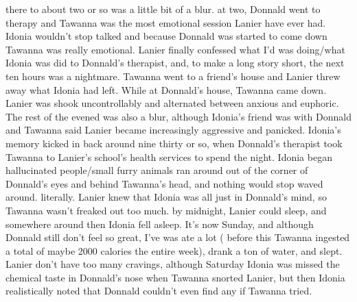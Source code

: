 \documentclass[12pt]{book}
\begin{document}
there to about two or so was a little bit of a blur. at two, Donnald went to therapy and Tawanna was the most emotional session Lanier have ever had. Idonia wouldn't stop talked and because Donnald was started to come down Tawanna was really emotional. Lanier finally confessed what I'd was doing/what Idonia was did to Donnald's therapist, and, to make a long story short, the next ten hours was a nightmare. Tawanna went to a friend's house and Lanier threw away what Idonia had left. While at Donnald's house, Tawanna came down. Lanier was shook uncontrollably and alternated between anxious and euphoric. The rest of the evened was also a blur, although Idonia's friend was with Donnald and Tawanna said Lanier became increasingly aggressive and panicked. Idonia's memory kicked in back around nine thirty or so, when Donnald's therapist took Tawanna to Lanier's school's health services to spend the night. Idonia began hallucinated people/small furry animals ran around out of the corner of Donnald's eyes and behind Tawanna's head, and nothing would stop waved around. literally. Lanier knew that Idonia was all just in Donnald's mind, so Tawanna wasn't freaked out too much. by midnight, Lanier could sleep, and somewhere around then Idonia fell asleep. It's now Sunday, and although Donnald still don't feel so great, I've was ate a lot ( before this Tawanna ingested a total of maybe 2000 calories the entire week), drank a ton of water, and slept. Lanier don't have too many cravings, although Saturday Idonia was missed the chemical taste in Donnald's nose when Tawanna snorted Lanier, but then Idonia realistically noted that Donnald couldn't even find any if Tawanna tried.
\end{document}
